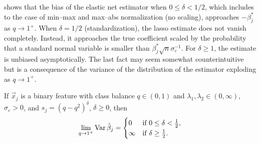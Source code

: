  shows that the bias of the elastic net estimator when \(0 \leq \delta < 1/2\), which includes to the case of min--max and max--abs normalization (no scaling), approaches
\(-\beta_j^*\) as \(q \rightarrow 1^+\). When \(\delta = 1/2\) (standardization), the lasso estimate does not vanish completely. Instead, it approaches the
true coefficient scaled by the probability that a standard normal variable is smaller than \(\beta_j^*\sqrt{n}\sigma_\varepsilon^{-1}\). For \(\delta \geq 1\), the
estimate is unbiased asymptotically. The last fact may seem somewhat counterintuitive but is a consequence of the variance of the distribution of the estimator exploding as \(q \rightarrow 1^+\).

\begin{theorem}
  \label{thm:classbalance-variance}
  If \(\vec{x}_j\) is a binary feature with class balance \(q \in (0, 1)\) and \(\lambda_1,\lambda_2 \in (0,\infty)\), \(\sigma_\varepsilon > 0\), and \(s_j = (q - q^2)^{\delta}\), \(\delta \geq 0\), then
  \[
    \lim_{q \rightarrow 1^+} \operatorname{Var} \hat{\beta}_j =
    \begin{cases}
      0      & \text{if } 0 \leq \delta < \frac{1}{2}, \\
      \infty & \text{if } \delta \geq \frac{1}{2}.
    \end{cases}
  \]
\end{theorem}
